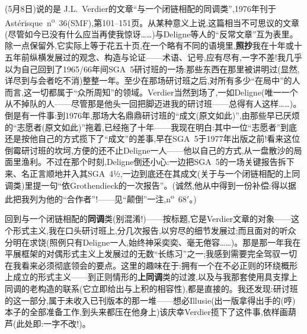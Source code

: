 (5月8日)说的是 J.L.~Verdier的文章“与一个闭链相配的同调类”,1976年刊于Astérisque~n\textsuperscript{o}~36(SMF),第101--151页。从某种意义上说,这篇相当不可思议的文章(尽管如今已没有什么应当再使我惊讶……)与Deligne等人的“反常文章”互为表里。除一点保留外,它实际上等于花五十页,在一个略有不同的语境里,\textbf{照抄}我在十年或十五年前纵横发展过的观念、构造与论证——术语、记号,应有尽有,一字不差!我几乎以为自己回到了1965/66年间SGA~5研讨班的一场:那些东西在那里被讲明过(显然,详尽到与会者吃不消)整整一年。至少在那场研讨班之后,对所有多少“在局中”的人而言,这一切都属于“众所周知”的领域。Verdier当然到场了,一如Deligne(唯一一个从不掉队的人——尽管那是他头一回把脚迈\dmark{}进我的研讨班——总得有人这样……)。倒是有一件事:到1976年,那场大名鼎鼎研讨班的“成文(原文如此)”,由那些早已厌烦的“志愿者(原文如此)”拖着,已经拖了十年——我现在明白:其中一位“志愿者”到底还是按他自己的方式揽下了“成文”的差事,早在SGA~5于1977年出版之前!看来这位倒霉研讨班的坎坷,方便的还不止Deligne一人——他以自己的方式,从一盘散沙的局面里渔利。不过在那个时刻,Deligne倒还小心:一边把SGA~5的一场关键报告拆下来、名正言顺地并入其SGA~4½,一边到底还在其成文(关于与一个闭链相配的上同调类)里提一句“依Grothendieck的一次报告”。(诚然,他从中得到一份补偿:得以据此把我列为他的“合作者”!——见“颠倒”一注,n\textsuperscript{o}~68$'$。)

回到与一个闭链相配的\textbf{同调}类(别混淆!)——按标题,它是Verdier文章的对象——这个形式主义,我在口头研讨班上,分几次报告,以穷尽的细节发展过;而且面对的听众分明在求饶(照例只有Deligne一人,始终神采奕奕、毫无倦容……)。那是那一年我在平展框架的对偶形式主义上发展过的无数“长练习”之一;我感到需要完全驾驭一切在我看来必须彻底领会的要点。这里的趣味在于:拥有一个在不必正则的环绕概形上成立的形式主义——到正则情形的\textbf{上同调}类的过渡,以及与我那套使用具支撑上同调的老构造的联系(它立即给出与上积的相容性),都是直接的。我还发现:\dmark{}研讨班的这一部分,属于未收入已刊版本的那一堆——想必Illusie(出一版拿得出手的(哼)本子的全部准备工作,到头来都压在他身上)该庆幸Verdier揽下了这件事,依样画葫芦(此处即:一字不改!)。

